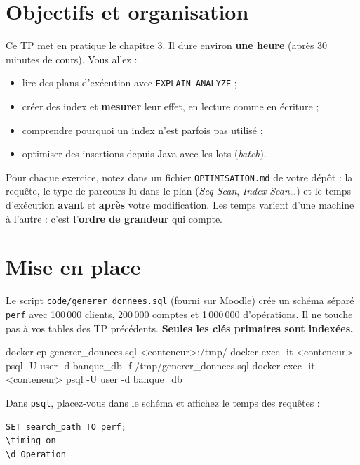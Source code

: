\documentclass[11pt]{article}
\begin{document}

\section{Objectifs et organisation}

Ce TP met en pratique le chapitre 3. Il dure environ \textbf{une heure} (apr\`es 30 minutes de cours).
Vous allez :
\begin{itemize}
  \item lire des plans d'ex\'ecution avec \texttt{EXPLAIN ANALYZE} ;
  \item cr\'eer des index et \textbf{mesurer} leur effet, en lecture comme en \'ecriture ;
  \item comprendre pourquoi un index n'est parfois pas utilis\'e ;
  \item optimiser des insertions depuis Java avec les lots (\textit{batch}).
\end{itemize}

\begin{infobox}[Ce qu'on attend]
Pour chaque exercice, notez dans un fichier \texttt{OPTIMISATION.md} de votre d\'ep\^ot :
la requ\^ete, le type de parcours lu dans le plan (\textit{Seq Scan}, \textit{Index Scan}\ldots) et le temps
d'ex\'ecution \textbf{avant} et \textbf{apr\`es} votre modification. Les temps varient d'une machine \`a l'autre :
c'est l'\textbf{ordre de grandeur} qui compte.
\end{infobox}

\section{Mise en place}

Le script \texttt{code/generer\_donnees.sql} (fourni sur Moodle) cr\'ee un sch\'ema s\'epar\'e \texttt{perf} avec
100\,000 clients, 200\,000 comptes et 1\,000\,000 d'op\'erations. Il ne touche pas \`a vos tables des TP pr\'ec\'edents.
\textbf{Seules les cl\'es primaires sont index\'ees.}

\begin{codebox}
docker cp generer_donnees.sql <conteneur>:/tmp/
docker exec -it <conteneur> psql -U user -d banque_db -f /tmp/generer_donnees.sql
docker exec -it <conteneur> psql -U user -d banque_db
\end{codebox}

Dans \texttt{psql}, placez-vous dans le sch\'ema et affichez le temps des requ\^etes :
\begin{lstlisting}
SET search_path TO perf;
\timing on
\d Operation
\end{lstlisting}
\end{document}
